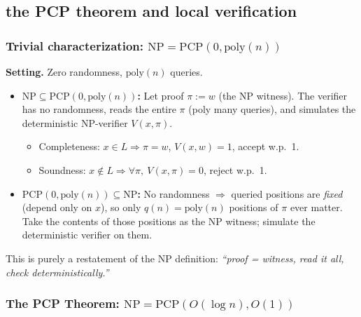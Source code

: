 
\subsection*{the PCP theorem and local verification}


\subsubsection*{Trivial characterization: $\mathrm{NP} = \mathrm{PCP}(0,\mathrm{poly}(n))$}

\textbf{Setting.} Zero randomness, $\mathrm{poly}(n)$ queries.

\begin{itemize}
  \item \textbf{$\mathrm{NP}\subseteq \mathrm{PCP}(0,\mathrm{poly}(n))$:}
  Let proof $\pi := w$ (the NP witness). The verifier has no randomness,
  reads the entire $\pi$ (poly many queries), and simulates the
  deterministic NP-verifier $V(x,\pi)$.
  \begin{itemize}
    \item Completeness: $x\in L \Rightarrow \pi=w$, $V(x,w)=1$, accept w.p.\ 1.
    \item Soundness: $x\notin L \Rightarrow \forall \pi,\ V(x,\pi)=0$, reject w.p.\ 1.
  \end{itemize}

  \item \textbf{$\mathrm{PCP}(0,\mathrm{poly}(n))\subseteq \mathrm{NP}$:}
  No randomness $\Rightarrow$ queried positions are \emph{fixed} (depend only on $x$),
  so only $q(n)=\mathrm{poly}(n)$ positions of $\pi$ ever matter. Take the
  contents of those positions as the NP witness; simulate the deterministic
  verifier on them.
\end{itemize}

This is purely a restatement of the NP definition: \emph{``proof = witness,
read it all, check deterministically.''}

\subsubsection*{The PCP Theorem: $\mathrm{NP} = \mathrm{PCP}(O(\log n), O(1))$}

